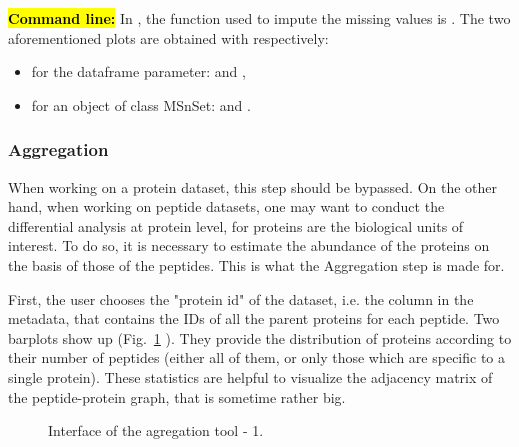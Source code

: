 \documentclass[12pt]{article}
\begin{document}
{\hl{\bf Command line:} In , the function used to impute the 
missing values is . The two aforementioned plots 
are obtained with respectively:
\begin{itemize}
\item for the dataframe parameter:  and 
,
\item for an object of class MSnSet:  and 
.
\end{itemize}}

\subsubsection{Aggregation}\label{aggregation}


{When working on a protein dataset, this step should be bypassed. On the other 
hand, when working on peptide datasets, one may want to conduct the 
differential analysis at protein level, for proteins are the biological units 
of interest. To do so, it is necessary to estimate the abundance of the 
proteins on the basis of those of the peptides. This is what the Aggregation 
step is made for.}

{First, the user chooses the "protein id" of the dataset, i.e. the column in 
the metadata, that contains the IDs of all the parent proteins for each 
peptide. 
Two barplots show up (Fig.~\ref{fig:agreg1} ). They provide the distribution 
of proteins according to their number of peptides (either all of them, or 
only those which are specific to a single protein). These statistics are 
helpful to visualize the adjacency matrix of the peptide-protein graph, that 
is sometime rather big.}


\begin {figure}
\centering
{}
\caption{Interface of the agregation tool - 1.}\label{fig:agreg1}
\end {figure}
\end{document}
